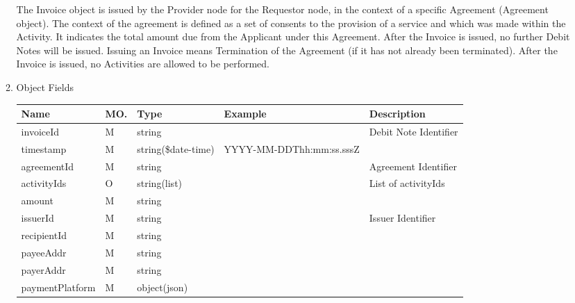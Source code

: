 \begin{enumerate}
\begin{enumerate}
The Invoice object is issued by the Provider node for the Requestor node,
in the context of a specific Agreement (Agreement object).
The context of the agreement is defined as a set of consents to the provision of a service and which was made within the Activity.
It indicates the total amount due from the Applicant under this Agreement.
After the Invoice is issued, no further Debit Notes will be issued.
Issuing an Invoice means Termination of the Agreement (if it has not already been terminated).
After the Invoice is issued, no Activities are allowed to be performed.


\item Object Fields

\begin{table}[H]
\footnotesize

\begin{center}
\begin{tabular}{|p{3cm}|l|p{3cm}|p{3cm}|p{4cm}|} 
\hline
\rowcolor{lightgray}	Name	& MO.	& Type	& Example & 	Description \\
\hline

invoiceId	 			& M & string 				&  							&  Debit Note Identifier \\
\hline	

timestamp 				& M & string(\$date-time) 	&  YYYY-MM-DDThh:mm:ss.sssZ	&  \\
\hline

agreementId				& M & string 				&  							&  Agreement Identifier \\
\hline	

activityIds				& O & string(list)			&							& List of activityIds \\
\hline

amount	 				& M & string 				&  							&   \\
\hline

issuerId				& M &  string				&							& Issuer Identifier \\
\hline

recipientId				& M & string 				&  							&   \\
\hline

payeeAddr				& M & string 				&  							&   \\
\hline

payerAddr				& M & string 				&  							&   \\
\hline

paymentPlatform			& M & object(json) 			&  							&   \\
\hline


\end{tabular}
\end{center}
\end{table}
\end{enumerate}
\end{enumerate}
